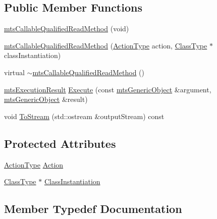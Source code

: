 \subsection*{Public Member Functions}
\begin{DoxyCompactItemize}
\item 
\hyperlink{classmts_callable_qualified_read_method_a098279bdc51bf3652822ab8e21061fb0}{mts\+Callable\+Qualified\+Read\+Method} (void)
\item 
\hyperlink{classmts_callable_qualified_read_method_a5e7503b7d68e7d603174b693a4c97616}{mts\+Callable\+Qualified\+Read\+Method} (\hyperlink{classmts_callable_qualified_read_method_a6327de6d1017295be394178d8e03b121}{Action\+Type} action, \hyperlink{classmts_callable_qualified_read_method_a6cfee5c3c3c49c691c2f5176ea79d735}{Class\+Type} $\ast$class\+Instantiation)
\item 
virtual \hyperlink{classmts_callable_qualified_read_method_a6dde782b8c89d361aab0110b80befbbb}{$\sim$mts\+Callable\+Qualified\+Read\+Method} ()
\item 
\hyperlink{classmts_execution_result}{mts\+Execution\+Result} \hyperlink{classmts_callable_qualified_read_method_a834b39e11c3048d401ebbff94123f729}{Execute} (const \hyperlink{classmts_generic_object}{mts\+Generic\+Object} \&argument, \hyperlink{classmts_generic_object}{mts\+Generic\+Object} \&result)
\item 
void \hyperlink{classmts_callable_qualified_read_method_a279196a1b216f18f168c98a17dc89901}{To\+Stream} (std\+::ostream \&output\+Stream) const 
\end{DoxyCompactItemize}
\subsection*{Protected Attributes}
\begin{DoxyCompactItemize}
\item 
\hyperlink{classmts_callable_qualified_read_method_a6327de6d1017295be394178d8e03b121}{Action\+Type} \hyperlink{classmts_callable_qualified_read_method_a50eaa90d9c1fb7ffa80933c21869c1b8}{Action}
\item 
\hyperlink{classmts_callable_qualified_read_method_a6cfee5c3c3c49c691c2f5176ea79d735}{Class\+Type} $\ast$ \hyperlink{classmts_callable_qualified_read_method_ae3b6667da77471acabf410afa3a541d1}{Class\+Instantiation}
\end{DoxyCompactItemize}


\subsection{Member Typedef Documentation}
\hypertarget{classmts_callable_qualified_read_method_a6327de6d1017295be394178d8e03b121}{}
